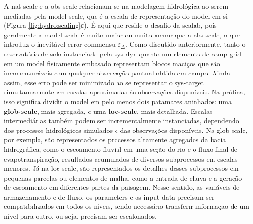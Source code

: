 \documentclass[./main.tex]{subfiles}
\begin{document}
\par A \gls{nat-scale} e a \gls{obs-scale} relacionam-se na modelagem hidrológica ao serem mediadas pela \gls{model-scale}, que é a escala de representação do \gls{model} em si (Figura \ref{fig:hydro:scaling}\textbf{c}). É aqui que reside o desafio da \gls{scalab}, pois geralmente a \gls{model-scale} é muito maior ou muito menor que a \gls{obs-scale}, o que introduz o inevitável \gls{error-commensu} $\varepsilon_{\Delta}$. Como discutido anteriormente, tanto o reservatório de solo instanciado pela \gls{sys-dyn} quanto um elemento de \gls{comp-grid} em um \gls{model} fisicamente embasado representam blocos maciços que são incomensuráveis com qualquer observação pontual obtida em campo. Ainda assim, esse erro pode ser minimizado ao se representar o \gls{sys-target} simultaneamente em escalas aproximadas às observações disponíveis. Na prática, isso significa dividir o \gls{model} em pelo menos dois patamares aninhados: uma \textbf{\gls{glob-scale}}, mais agregada, e uma \textbf{ \gls{loc-scale}}, mais detalhada. Escalas intermediárias também podem ser incrementalmente instanciadas, dependendo dos processos hidrológicos simulados e das observações disponíveis. Na \gls{glob-scale}, por exemplo, são representados os processos altamente agregados da bacia hidrográfica, como o escoamento fluvial em uma seção do rio e o fluxo final de evapotranspiração, resultados acumulados de diversos subprocessos em escalas menores. Já na \gls{loc-scale}, são representados os detalhes desses subprocessos em pequenas parcelas ou elementos de malha, como a entrada de chuva e a geração de escoamento em diferentes partes da paisagem. Nesse sentido, as variáveis de armazenamento e de fluxo, os \gls{parameters} e os \gls{input-data} precisam ser compatibilizados em todos os níveis, sendo necessário transferir informação de um nível para outro, ou seja, precisam ser escalonados. 
\end{document}
